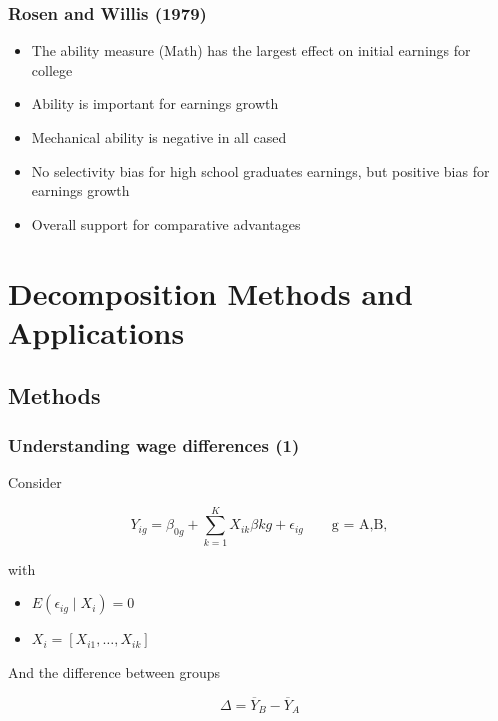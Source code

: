 \documentclass{beamer}
\newcommand{\1}{\mathbb{1}}
\begin{document}
\begin{frame}\frametitle{Rosen and Willis (1979)}
\begin{itemize}
\item The ability measure (Math) has the largest effect on initial earnings for college
\item Ability is important for earnings growth
\item Mechanical ability is negative in all cased
\item No selectivity bias for high school graduates earnings, but positive bias for earnings growth
\item Overall support for comparative advantages
\end{itemize}
\end{frame}

\section{Decomposition Methods and Applications}

\subsection{Methods}


\begin{frame}\frametitle{Understanding wage differences (1)}
Consider

\begin{equation*}
Y_{ig} = \beta_{0g} + \sum_{k=1}^{K} X_{ik}\beta{kg} + \epsilon_{ig} \qquad \text{g = A,B}, 
\end{equation*}

with 
\begin{itemize}
\item $E(\epsilon_{ig} \mid X_i) = 0$
\item $X_i = [X_{i1}, \ldots, X_{ik}]$
\end{itemize}

And the difference between groups

\begin{equation*}
\Delta = \overline{Y}_B - \overline{Y}_A
\end{equation*}
\end{frame}
\end{document}
